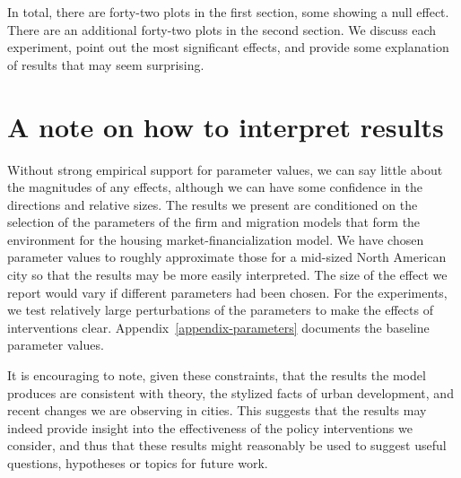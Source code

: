 In total, there are forty-two plots in the first section, some showing a null effect. There are an additional forty-two plots in the second section. We discuss each experiment, point out the most significant effects, and provide some explanation of results that may seem surprising.  

\section{A note on how to interpret results}

Without strong empirical support for parameter values, we can say little about the magnitudes of any effects, although we can have some confidence in the directions and relative sizes.  
The results we present are conditioned on the selection of the parameters of the firm and migration models that form the environment for the housing market-financialization model. We have chosen parameter values to roughly approximate those for a mid-sized North American city so that the results may be more easily interpreted. The size of the effect we report would vary if different parameters had been chosen. %
For the experiments, we test relatively large perturbations of the parameters to make the effects of interventions clear. Appendix~\ref{appendix-parameters} documents the baseline parameter values. 

It is encouraging to note, given these constraints, that the results the model produces are consistent with theory, the stylized facts of urban development, and recent changes we are observing in cities. 
This suggests that the results may indeed provide insight into the effectiveness of the policy interventions we consider, and thus that these results might reasonably be used to suggest useful questions, hypotheses or topics for future work. 

